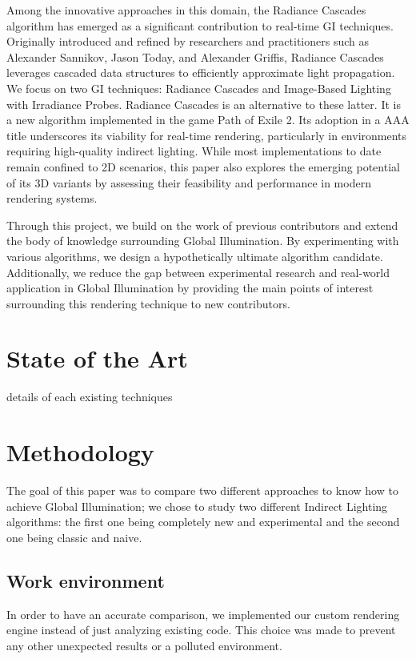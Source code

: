 \documentclass{rapportCS}
\begin{document}
Among the innovative approaches in this domain, the Radiance Cascades algorithm has emerged as a significant contribution to real-time GI techniques. Originally introduced and refined by researchers and practitioners such as Alexander Sannikov, Jason Today, and Alexander Griffis, Radiance Cascades leverages cascaded data structures to efficiently approximate light propagation. We focus on two GI techniques: Radiance Cascades and Image-Based Lighting with Irradiance Probes. Radiance Cascades is an alternative to these latter. It is a new algorithm implemented in the game Path of Exile 2. Its adoption in a AAA title underscores its viability for real-time rendering, particularly in environments requiring high-quality indirect lighting. While most implementations to date remain confined to 2D scenarios, this paper also explores the emerging potential of its 3D variants by assessing their feasibility and performance in modern rendering systems.

Through this project, we build on the work of previous contributors and extend the body of knowledge surrounding Global Illumination. By experimenting with various algorithms, we design a hypothetically ultimate algorithm candidate. Additionally, we reduce the gap between experimental research and real-world application in Global Illumination by providing the main points of interest surrounding this rendering technique to new contributors.


\section{State of the Art}

details of each existing techniques


\section{Methodology}
The goal of this paper was to compare two different approaches to know how to achieve Global Illumination; we chose to study two different Indirect Lighting algorithms: the first one being completely new and experimental and the second one being classic and naive.


\subsection{Work environment}
In order to have an accurate comparison, we implemented our custom rendering engine instead of just analyzing existing code. This choice was made to prevent any other unexpected results or a polluted environment.
\end{document}
